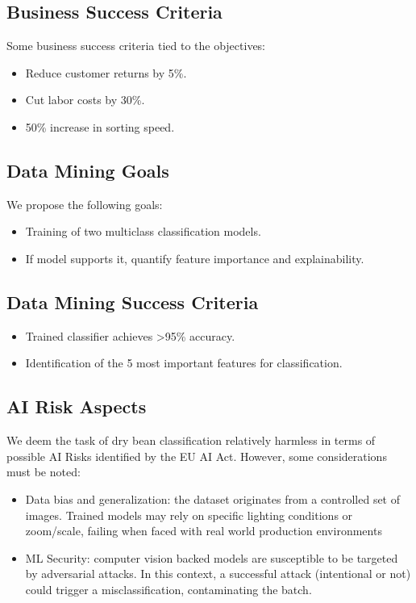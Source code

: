 \documentclass[sigconf]{acmart}
\begin{document}
\subsection{Business Success Criteria}
Some business success criteria tied to the objectives:
\begin{itemize}
    \item Reduce customer returns by 5\%.
    \item Cut labor costs by 30\%.
    \item 50\% increase in sorting speed.
\end{itemize}


\subsection{Data Mining Goals}
We propose the following goals:
\begin{itemize}
    \item Training of two multiclass classification models.
    \item If model supports it, quantify feature importance and explainability.
\end{itemize}

\subsection{Data Mining Success Criteria}
\begin{itemize}
    \item Trained classifier achieves >95\% accuracy.
    \item Identification of the 5 most important features for classification.
\end{itemize}

\subsection{AI Risk Aspects}
We deem the task of dry bean classification relatively harmless in terms of possible AI Risks identified by the EU AI Act. However, some considerations must be noted:
\begin{itemize}
    \item Data bias and generalization: the dataset originates from a controlled set of images. Trained models may rely on specific lighting conditions or zoom/scale, failing when faced with real world production environments
    \item ML Security: computer vision backed models are susceptible to be targeted by adversarial attacks. In this context, a successful attack (intentional or not) could trigger a misclassification, contaminating the batch.
\end{itemize}
\end{document}
